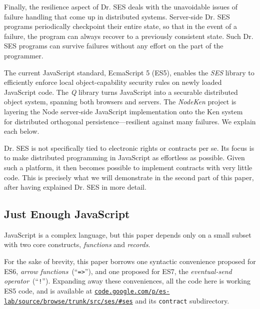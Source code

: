 \documentclass{llncs}
\newcommand{\myurl}[1]{{\href{http://#1}{\texttt{#1}}}}
\begin{document}
Finally, the resilience aspect of Dr. SES deals with the unavoidable issues of failure handling that come up in distributed systems.
Server-side Dr. SES programs periodically checkpoint their entire state, so that in the event of a failure, the program can always recover to a previously consistent state. Such Dr. SES programs can survive failures without any effort on the part of the programmer.


The current JavaScript standard, EcmaScript 5 (ES5), enables the \emph{SES} library to efficiently enforce local object-capability security rules on newly loaded JavaScript code. The \emph{Q} library turns JavaScript into a securable distributed object system, spanning both browsers and servers. The \emph{NodeKen} project is layering the Node server-side JavaScript implementation onto the Ken system~\cite{Yoo:CKen} for distributed orthogonal persistence---resilient against many failures. We explain each below.

Dr. SES is not specifically tied to electronic rights or contracts per se. Its focus is to make distributed programming in JavaScript as effortless as possible. Given such a platform, it then becomes possible to implement contracts with very little code. This is precisely what we will demonstrate in the second part of this paper, after having explained Dr. SES in more detail.



\subsection{Just Enough JavaScript}

JavaScript is a complex language, but this paper depends only on a small subset with two core constructs, \emph{functions} and \emph{records}. 

For the sake of brevity, this paper borrows one syntactic convenience proposed for ES6, \emph{arrow functions}~(``{\tt =>}''), and one proposed for ES7, the \emph{eventual-send operator}~(``{\tt !}''). Expanding away these conveniences, all the code here is working ES5 code, and is available at \myurl{code.google.com/p/es-lab/source/browse/trunk/src/ses/\#ses} and its {\tt contract} subdirectory.
\end{document}
